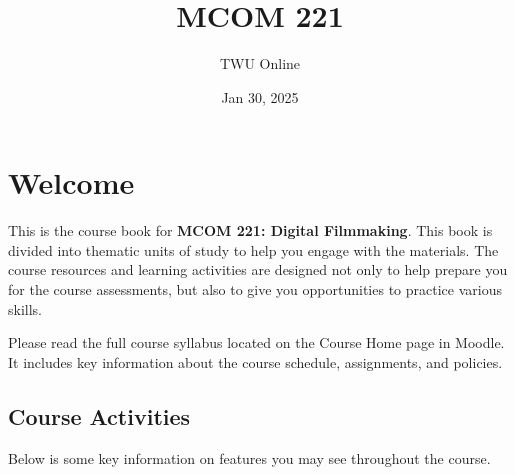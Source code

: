 \documentclass[
  letterpaper,
  DIV=11,
  numbers=noendperiod]{scrreprt}
\title{MCOM 221}
\author{TWU Online}
\date{Jan 30, 2025}
\renewcommand*\contentsname{Table of contents}
\newcommand\contentsname{Table of contents}
\begin{document}
\maketitle

\renewcommand*\contentsname{Table of contents}
{
\hypersetup{linkcolor=}
\setcounter{tocdepth}{2}
\tableofcontents
}

\chapter*{Welcome}\label{welcome}


This is the course book for \textbf{MCOM 221: Digital Filmmaking}. This
book is divided into thematic units of study to help you engage with the
materials. The course resources and learning activities are designed not
only to help prepare you for the course assessments, but also to give
you opportunities to practice various skills.

\begin{tcolorbox}[enhanced jigsaw, toprule=.15mm, colframe=quarto-callout-note-color-frame, colback=white, arc=.35mm, left=2mm, rightrule=.15mm, bottomrule=.15mm, opacityback=0, breakable, leftrule=.75mm]
\begin{minipage}[t]{5.5mm}
\textcolor{quarto-callout-note-color}{\faInfo}
\end{minipage}%
\begin{minipage}[t]{\textwidth - 5.5mm}

Please read the full course syllabus located on the Course Home page in
Moodle. It includes key information about the course schedule,
assignments, and policies.

\end{minipage}%
\end{tcolorbox}

\section*{Course Activities}\label{course-activities}


Below is some key information on features you may see throughout the
course.
\end{document}
